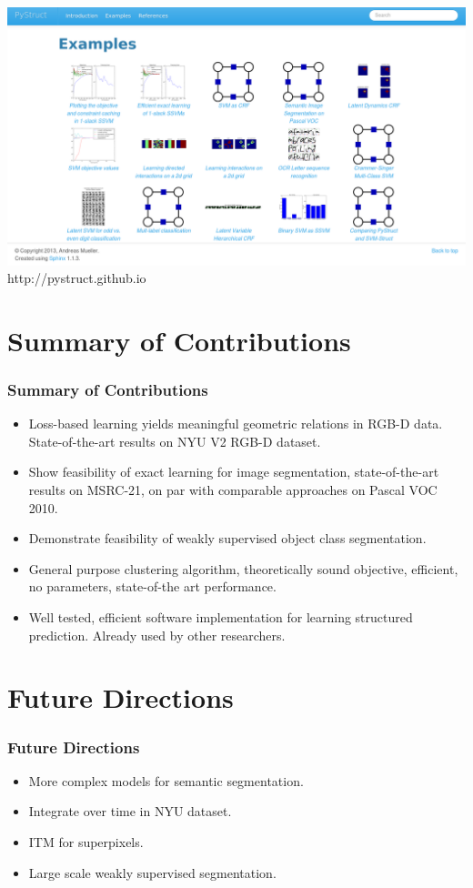 \documentclass[final,ignorenonframetext,compress]{beamer}
\begin{document}
\begin{frame}
    \begin{center}
        \includegraphics[width=\linewidth]{images/example_gallery}\\
        http://pystruct.github.io
    \end{center}
\end{frame}


\section*{Summary of Contributions}
\begin{frame}
    \frametitle{Summary of Contributions}
    \begin{itemize}
        \item<1-> Loss-based learning yields meaningful geometric relations in RGB-D data. State-of-the-art results on NYU V2 RGB-D dataset.
        \item<2-> Show feasibility of exact learning for image segmentation, state-of-the-art results on MSRC-21, on par with comparable approaches on Pascal VOC 2010.
        \item<3-> Demonstrate feasibility of weakly supervised object class segmentation.
        \item<4-> General purpose clustering algorithm, theoretically sound objective, efficient, no parameters, state-of-the art performance.
        \item<5-> Well tested, efficient software implementation for learning structured prediction. Already used by other researchers.
    \end{itemize}
\end{frame}

\section*{Future Directions}
\begin{frame}
    \frametitle{Future Directions}
    \begin{itemize}
        \item More complex models for semantic segmentation.
        \item Integrate over time in NYU dataset.
        \item ITM for superpixels.
        \item Large scale weakly supervised segmentation.
    \end{itemize}
\end{frame}
\end{document}
